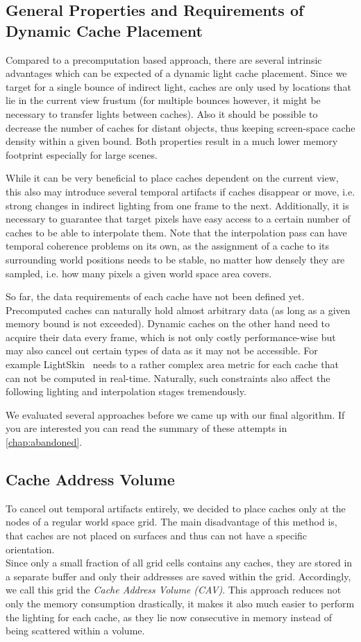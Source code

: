 \documentclass[thesis.tex]{subfiles}
\begin{document}
\subsection{General Properties and Requirements of Dynamic Cache Placement}
Compared to a precomputation based approach, there are several intrinsic advantages which can be expected of a dynamic light cache placement.
Since we target for a single bounce of indirect light, caches are only used by locations that lie in the current view frustum (for multiple bounces however, it might be necessary to transfer lights between caches).
Also it should be possible to decrease the number of caches for distant objects, thus keeping screen-space cache density within a given bound.
Both properties result in a much lower memory footprint especially for large scenes.

While it can be very beneficial to place caches dependent on the current view, this also may introduce several temporal artifacts if caches disappear or move, i.e. strong changes in indirect lighting from one frame to the next.
Additionally, it is necessary to guarantee that target pixels have easy access to a certain number of caches to be able to interpolate them.
Note that the interpolation pass can have temporal coherence problems on its own, as the assignment of a cache to its surrounding world positions needs to be stable, no matter how densely they are sampled, i.e. how many pixels a given world space area covers.

So far, the data requirements of each cache have not been defined yet.
Precomputed caches can naturally hold almost arbitrary data (as long as a given memory bound is not exceeded).
Dynamic caches on the other hand need to acquire their data every frame, which is not only costly performance-wise but may also cancel out certain types of data as it may not be accessible. For example LightSkin~\cite{bib:LightskinPaper} needs to a rather complex area metric for each cache that can not be computed in real-time.
Naturally, such constraints also affect the following lighting and interpolation stages tremendously.

We evaluated several approaches before we came up with our final algorithm.
If you are interested you can read the summary of these attempts in \autoref{chap:abandoned}.

\subsection{Cache Address Volume}
To cancel out temporal artifacts entirely, we decided to place caches only at the nodes of a regular world space grid.
The main disadvantage of this method is, that caches are not placed on surfaces and thus can not have a specific orientation.\\
Since only a small fraction of all grid cells contains any caches, they are stored in a separate buffer and only their addresses are saved within the grid.
Accordingly, we call this grid the \emph{Cache Address Volume (CAV)}.
This approach reduces not only the memory consumption drastically, it makes it also much easier to perform the lighting for each cache, as they lie now consecutive in memory instead of being scattered within a volume.
\end{document}
